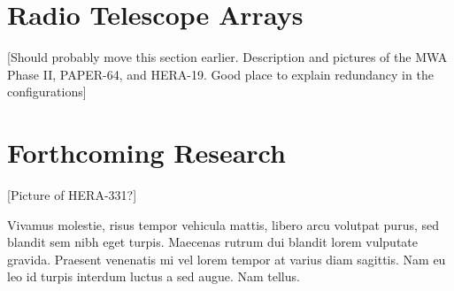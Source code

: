\documentclass[a0,landscape]{a0poster}
\begin{document}
\begin{multicols}{4}

\section*{Radio Telescope Arrays}

[Should probably move this section earlier. Description and pictures of the MWA Phase II, PAPER-64, and HERA-19. Good place to explain redundancy in the configurations]






\color{DarkSlateGray} %


\section*{Forthcoming Research}

[Picture of HERA-331?]

Vivamus molestie, risus tempor vehicula mattis, libero arcu volutpat purus, sed blandit sem nibh eget turpis. Maecenas rutrum dui blandit lorem vulputate gravida. Praesent venenatis mi vel lorem tempor at varius diam sagittis. Nam eu leo id turpis interdum luctus a sed augue. Nam tellus.


\nocite{*} %


\end{multicols}
\end{document}
